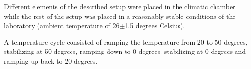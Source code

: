 Different elements of the described setup were placed in the climatic chamber while the rest 
of the setup was placed in a reasonably stable conditions of the laboratory (ambient temperature 
of 26$\pm$1.5 degrees Celsius). 

A temperature cycle consisted of ramping the temperature from 20 to 50 degrees, stabilizing 
at 50 degrees, ramping down to 0 degrees, stabilizing at 0 degrees and ramping up back to 20 degrees. 




